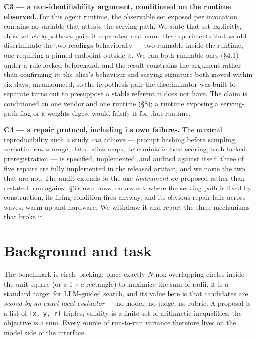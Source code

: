 \textbf{C3 --- a non-identifiability argument, conditioned on the runtime observed.} For this agent runtime, the observable set exposed per invocation contains no variable that attests the serving path. We state that set explicitly, show which hypothesis pairs it separates, and name the experiments that would discriminate the two readings behaviorally --- two runnable inside the runtime, one requiring a pinned endpoint outside it. We ran both runnable ones (\S4.1) under a rule locked beforehand, and the result constrains the argument rather than confirming it: the alias's behaviour and serving signature both moved within six days, unannounced, so the hypothesis pair the discriminator was built to separate turns out to presuppose a stable referent it does not have. The claim is conditioned on one vendor and one runtime (\S8); a runtime exposing a serving-path flag or a weights digest would falsify it for that runtime.

\textbf{C4 --- a repair protocol, including its own failures.} The maximal reproducibility such a study \emph{can} achieve --- prompt hashing before sampling, verbatim raw storage, dated alias maps, deterministic local scoring, hash-locked preregistration --- is specified, implemented, and audited against itself: three of five repairs are fully implemented in the released artifact, and we name the two that are not. The audit extends to the one \emph{instrument} we proposed rather than restated: run against \S3's own rows, on a stack where the serving path is fixed by construction, its firing condition fires anyway, and its obvious repair fails across waves, warm-up and hardware. We withdraw it and report the three mechanisms that broke it.

\section{Background and task}

The benchmark is circle packing: place exactly $N$ non-overlapping circles inside the unit square (or a $1 \times a$ rectangle) to maximize the sum of radii. It is a standard target for LLM-guided search, and its value here is that candidates are \emph{scored by an exact local evaluator} --- no model, no judge, no rubric. A proposal is a list of \texttt{[x, y, r]} triples; validity is a finite set of arithmetic inequalities; the objective is a sum. Every source of run-to-run variance therefore lives on the model side of the interface.

